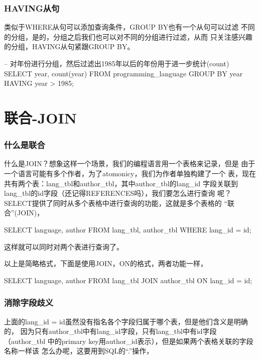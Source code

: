 \documentclass[a4paper,11pt]{article}
\begin{document}
\section[HAVING从句]{HAVING从句}
类似于WHERE从句可以添加查询条件，GROUP BY也有一个从句可以过滤
不同的分组，是的，分组之后我们也可以对不同的分组进行过滤，从而
只关注感兴趣的分组，HAVING从句紧跟GROUP BY。

\begin{sqlcode}
-- 对年份进行分组，然后过滤出1985年以后的年份用于进一步统计(count)
SELECT year, count(year) FROM programming_language
    GROUP BY year HAVING year > 1985;
\end{sqlcode}


\part[联合-JOIN]{联合-JOIN}
\section[什么是联合]{什么是联合}
什么是JOIN？想象这样一个场景，我们的编程语言用一个表格来记录，但是
由于一个语言可能有多个作者，为了atomonicy，我们为作者单独构建了一个
表，现在共有两个表：lang\_tbl和author\_tbl，其中author\_tbl的lang\_id
字段关联到lang\_tbl的id字段（还记得REFERENCES吗），我们要怎么进行查询
呢？SELECT提供了同时从多个表格中进行查询的功能，这就是多个表格的
“联合”(JOIN)，

\begin{sqlcode}
SELECT language, author FROM lang_tbl, author_tbl
    WHERE lang_id = id;
\end{sqlcode}

这样就可以同时对两个表进行查询了。

以上是简略格式，下面是使用JOIN，ON的格式，两者功能一样，

\begin{sqlcode}
SELECT language, author FROM lang_tbl JOIN author_tbl ON lang_id = id;
\end{sqlcode}

\section[消除字段歧义]{消除字段歧义}
上面的lang\_id = id虽然没有指名各个字段归属于哪个表，但是他们含义是明确的，
因为只有author\_tbl中有lang\_id字段，只有lang\_tbl中有id字段（author\_tbl
中的primary key用author\_id表示），但是如果两个表格关联的字段名称一样该
怎么办呢，这要用到SQL的“.”操作，
\end{document}
